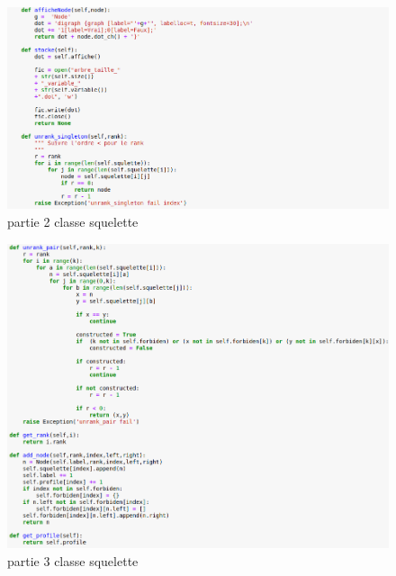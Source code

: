 \documentclass[french]{article}
\begin{document}
\begin{figure}[H]
    \centering
    \includegraphics[scale=0.4]{part2 squelette.png}
    \caption{partie 2 classe squelette}
    \label{fig:squelette2}
\end{figure}

\begin{figure}[H]
    \centering
    \includegraphics[scale=0.4]{part3 squelette.png}
    \caption{partie 3 classe squelette}
    \label{fig:squelette3}
\end{figure}




\newpage
{}
\printbibliography
\end{document}
